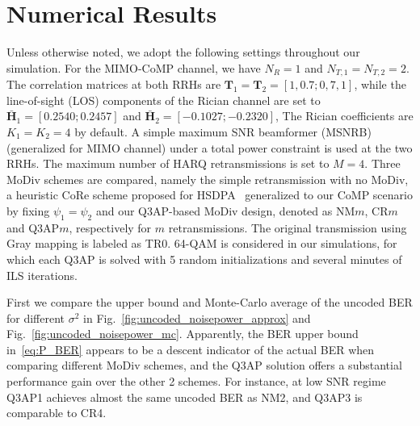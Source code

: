 \documentclass[journal]{IEEEtran}
\begin{document}
\section{Numerical Results}
\label{sec:numerical}
Unless otherwise noted, we adopt the following
settings throughout our simulation. For the MIMO-CoMP channel, we have $N_R=1$
and $N_{T, 1} = N_{T, 2} = 2$. The correlation matrices at both RRHs are
$\mathbf{T}_1 = \mathbf{T}_2 =[1,0.7;0,7,1]$, while the line-of-sight (LOS)
components of the Rician channel are set to $\bar{\mathbf{H}}_{1} = [0.2540;
0.2457]$ and $\bar{\mathbf{H}}_{2} = [-0.1027; -0.2320]$, 
The Rician coefficients are $K_1 = K_2 = 4$ by default. A simple maximum SNR
beamformer (MSNRB)~\cite{barriac2006space} (generalized for MIMO channel) under
a total power constraint is used at the two RRHs. 
The maximum number of HARQ retransmissions is set
to $M=4$. Three MoDiv schemes are compared, namely the simple retransmission with
no MoDiv, a heuristic CoRe scheme proposed for
HSDPA~\cite{panasonic2001enhanced} generalized to our CoMP scenario by fixing
$\psi_1 = \psi_2$ and our Q3AP-based MoDiv design, denoted
as NM$m$, CR$m$ and Q3AP$m$, respectively for $m$ retransmissions. The original
transmission using Gray mapping is labeled as TR0. 64-QAM is considered in our
simulations, for which each Q3AP is solved with 5 random initializations and
several minutes of ILS iterations.

First we compare the upper bound and Monte-Carlo average of the uncoded BER for
different $\sigma^2$ in Fig.~\ref{fig:uncoded_noisepower_approx} and 
Fig.~\ref{fig:uncoded_noisepower_mc}.
Apparently, the BER upper bound in~\eqref{eq:P_BER} appears to be a descent
indicator of the actual BER when comparing different MoDiv schemes, and the Q3AP
solution offers a substantial performance gain over the other 2 schemes. For
instance, at low SNR regime Q3AP1 achieves almost the same uncoded BER as NM2,
and Q3AP3 is comparable to CR4.
\end{document}
